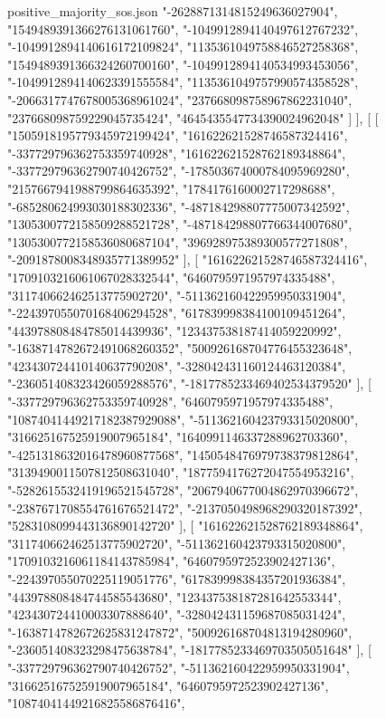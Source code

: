 \begin{filecontents*}[overwrite]{positive_majority_sos.json}
    "-2628871314815249636027904",
    "1549489391366276131061760",
    "-1049912894140497612767232",
    "-1049912894140616172109824",
    "1135361049758846527258368",
    "1549489391366324260700160",
    "-1049912894140534993453056",
    "-1049912894140623391555584",
    "1135361049757990574358528",
    "-2066317747678005368961024",
    "237668098758967862231040",
    "237668098759229045735424",
    "4645435547734390024962048"
   ]
  ],
  [
   [
    "1505918195779345972199424",
    "161622621528746587324416",
    "-337729796362753359740928",
    "161622621528762189348864",
    "-337729796362790740426752",
    "-178503674000784095969280",
    "2157667941988799864635392",
    "1784176160002717298688",
    "-685280624993030188302336",
    "-487184298807775007342592",
    "1305300772158509288521728",
    "-487184298807766344007680",
    "1305300772158536080687104",
    "396928975389300577271808",
    "-2091878008348935771389952"
   ],
   [
    "161622621528746587324416",
    "1709103216061067028332544",
    "6460795971957974335488",
    "311740662462513775902720",
    "-511362160422959950331904",
    "-224397055070168406294528",
    "617839998384100109451264",
    "443978808484785014439936",
    "123437538187414059220992",
    "-1638714782672491068260352",
    "500926168704776455323648",
    "423430724410140637790208",
    "-328042431160124463120384",
    "-236051408323426059288576",
    "-1817785233469402534379520"
   ],
   [
    "-337729796362753359740928",
    "6460795971957974335488",
    "10874041449217182387929088",
    "-511362160423793315020800",
    "316625167525919007965184",
    "1640991146337288962703360",
    "-4251318632016478960877568",
    "1450548476979738379812864",
    "3139490011507812508631040",
    "1877594176272047554953216",
    "-5282615532419196521545728",
    "2067940677004862970396672",
    "-2387671708554761676521472",
    "-2137050498968290320187392",
    "5283108099443136890142720"
   ],
   [
    "161622621528762189348864",
    "311740662462513775902720",
    "-511362160423793315020800",
    "1709103216061184143785984",
    "6460795972523902427136",
    "-224397055070225119051776",
    "617839998384357201936384",
    "443978808484744585543680",
    "123437538187281642553344",
    "423430724410003307888640",
    "-328042431159687085031424",
    "-1638714782672625831247872",
    "500926168704813194280960",
    "-236051408323298475638784",
    "-1817785233469703505051648"
   ],
   [
    "-337729796362790740426752",
    "-511362160422959950331904",
    "316625167525919007965184",
    "6460795972523902427136",
    "10874041449216825586876416",

\end{filecontents*}

